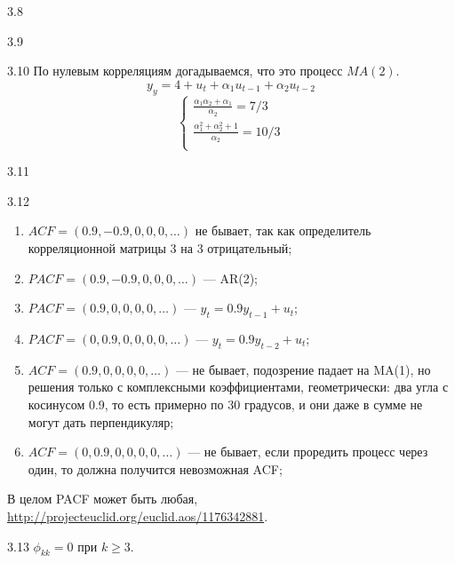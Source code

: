 \protect \hypertarget {soln:3.8}{}
\begin{solution}{{3.8}}
\end{solution}
\protect \hypertarget {soln:3.9}{}
\begin{solution}{{3.9}}
\end{solution}
\protect \hypertarget {soln:3.10}{}
\begin{solution}{{3.10}}
По нулевым корреляциям догадываемся, что это процесс $MA(2)$.
\[
y_y = 4 + u_t + \alpha_1 u_{t-1} + \alpha_2 u_{t-2}
\]
\[
\begin{cases}
  \frac{\alpha_1 \alpha_2 + \alpha_1}{\alpha_2} = 7/3 \\
  \frac{\alpha_1^2 + \alpha_2^2 + 1}{\alpha_2} = 10/3 \\
\end{cases}
\]


\end{solution}
\protect \hypertarget {soln:3.11}{}
\begin{solution}{{3.11}}
\end{solution}
\protect \hypertarget {soln:3.12}{}
\begin{solution}{{3.12}}
  \begin{enumerate}
    \item $ACF = (0.9, -0.9, 0, 0, 0, \ldots)$ не бывает, так как определитель корреляционной матрицы 3 на 3 отрицательный;
    \item $PACF = (0.9, -0.9, 0, 0, 0, \ldots)$ — AR(2);
    \item $PACF = (0.9, 0, 0, 0, 0, \ldots)$ — $y_t = 0.9y_{t-1} + u_t$;
    \item $PACF = (0, 0.9, 0, 0, 0, 0, \ldots)$ — $y_t = 0.9y_{t-2} + u_t$;
    \item $ACF = (0.9, 0, 0, 0, 0, \ldots)$ — не бывает, подозрение падает на MA(1), но решения только с комплексными коэффициентами, геометрически: два угла с косинусом 0.9, то есть примерно по 30 градусов, и они даже в сумме не могут дать перпендикуляр;
    \item $ACF = (0, 0.9, 0, 0, 0, 0, \ldots)$ — не бывает, если проредить процесс через один, то должна получится невозможная ACF;
  \end{enumerate}
   В целом PACF может быть любая,
   \url{http://projecteuclid.org/euclid.aos/1176342881}.
\end{solution}
\protect \hypertarget {soln:3.13}{}
\begin{solution}{{3.13}}
  $\phi_{kk}=0$ при $k \geq 3$.
\end{solution}
\protect \hypertarget {soln:3.14}{}
